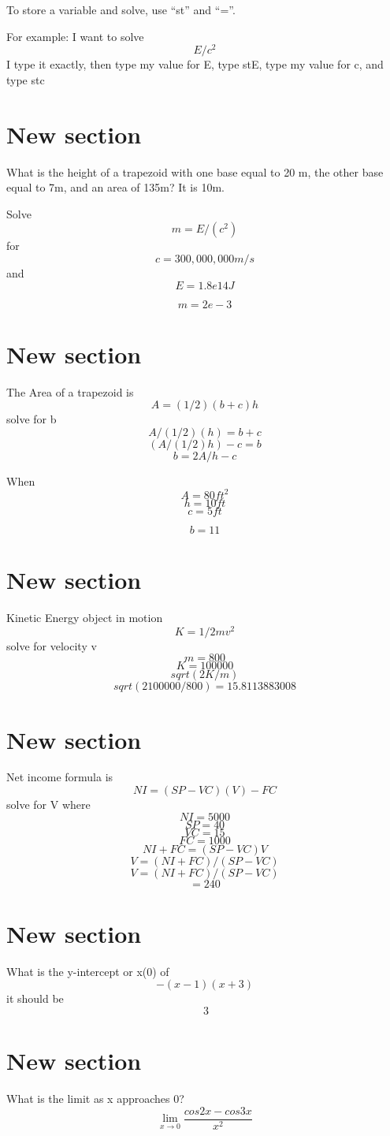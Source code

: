 \documentclass{article}
\begin{document}
To store a variable and solve, use ``st'' and ``=''.

For example: I want to solve $$E/c^2$$
I type it exactly, then type my value for E, type stE, type my value for c, and type stc

\section{New section}
What is the height of a trapezoid with one base equal to 20 m, the other base equal to 7m, and an area of 135m? It is 10m.

Solve $$m=E/(c^2)$$ for $$c = 300,000,000 m/s$$ and $$E = 1.8e14J$$

$$m = 2e-3$$

\section{New section}
The Area of a trapezoid is $$A=(1/2)(b+c)h $$ solve for b
$$A/(1/2)(h)=b+c$$
$$(A/(1/2)h)-c=b$$
$$b = 2 A / h - c $$

When $$A=80ft^2$$ $$h=10ft$$ $$c=5ft$$

$$b=11$$

\section{New section}
Kinetic Energy object in motion $$K=1/2mv^2$$ solve for velocity v
$$m=800$$
$$K=100000$$
$$sqrt(2K/m)$$
$$sqrt(2 100000/800) = 15.8113883008$$

\section{New section}
Net income formula is $$NI=(SP-VC)(V)-FC$$ solve for V where
$$NI=5000$$
$$SP=40$$
$$VC=15$$
$$FC=1000$$
$$NI+FC=(SP-VC)V$$
$$V=(NI+FC)/(SP-VC)$$
$$V=(NI+FC)/(SP-VC)$$
$$=240$$

\section{New section}

What is the y-intercept or x(0) of $$-(x-1)(x+3)$$ it should be $$~3$$

\section{New section}

What is the limit as x approaches 0? $$\lim_{x\to0} \frac{cos2x - cos3x}{x^2}$$
\end{document}
